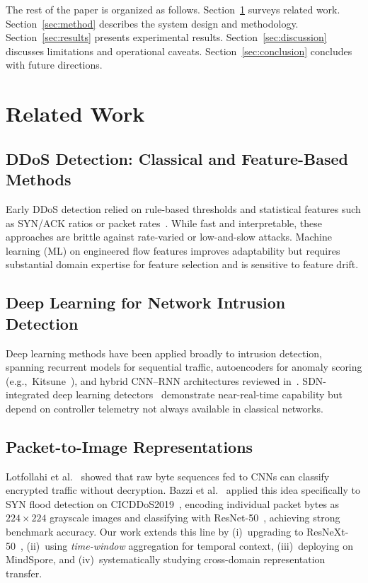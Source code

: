\documentclass[conference]{IEEEtran}
\begin{document}
The rest of the paper is organized as follows.
Section~\ref{sec:related} surveys related work.
Section~\ref{sec:method} describes the system design and methodology.
Section~\ref{sec:results} presents experimental results.
Section~\ref{sec:discussion} discusses limitations and operational caveats.
Section~\ref{sec:conclusion} concludes with future directions.

\section{Related Work}
\label{sec:related}

\subsection{DDoS Detection: Classical and Feature-Based Methods}
Early DDoS detection relied on rule-based thresholds and statistical features
such as SYN/ACK ratios or packet rates~\cite{sharafaldin2018developing}.
While fast and interpretable, these approaches are brittle against rate-varied or
low-and-slow attacks.
Machine learning (ML) on engineered flow features improves adaptability but
requires substantial domain expertise for feature selection and is sensitive to
feature drift.

\subsection{Deep Learning for Network Intrusion Detection}
Deep learning methods have been applied broadly to intrusion detection, spanning
recurrent models for sequential traffic, autoencoders for anomaly scoring
(e.g.,~Kitsune~\cite{mirsky2019kitsune}), and hybrid CNN–RNN architectures
reviewed in~\cite{vinayakumar2019deep}.
SDN-integrated deep learning detectors~\cite{niyaz2016deep} demonstrate
near-real-time capability but depend on controller telemetry not always available
in classical networks.

\subsection{Packet-to-Image Representations}
Lotfollahi et al.~\cite{lotfollahi2020deep} showed that raw byte sequences fed to
CNNs can classify encrypted traffic without decryption.
Bazzi et al.~\cite{bazzi2020resnet} applied this idea specifically to SYN flood
detection on CICDDoS2019~\cite{cicddos2019}, encoding individual packet bytes as
$224\times224$ grayscale images and classifying with ResNet-50~\cite{he2016deep},
achieving strong benchmark accuracy.
Our work extends this line by (i)~upgrading to ResNeXt-50~\cite{xie2017aggregated},
(ii)~using \textit{time-window} aggregation for temporal context,
(iii)~deploying on MindSpore, and (iv)~systematically studying cross-domain
representation transfer.
\end{document}
